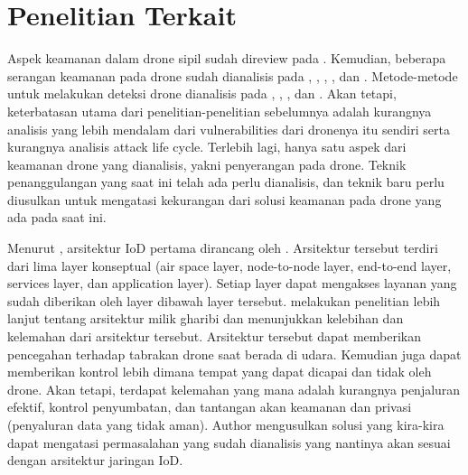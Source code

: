\section{Penelitian Terkait}
\label{sec:penelitianterkait}

Aspek keamanan dalam drone sipil sudah direview pada \citep{altawy2016security}. Kemudian, beberapa serangan keamanan pada drone sudah dianalisis pada \citep{he2017drone}, \citep{yampolskiy2013taxonomy}, \citep{sedjelmaci2018cyber}, \citep{humphreys2012statement}, dan \citep{shepard2012evaluation}. Metode-metode untuk melakukan deteksi drone dianalisis pada \citep{guvencc2017detection}, \citep{sturdivant2017systems}, \citep{shi2018anti}, dan \citep{nassi2019}. Akan tetapi, keterbatasan utama dari penelitian-penelitian sebelumnya adalah kurangnya analisis yang lebih mendalam dari vulnerabilities dari dronenya itu sendiri serta kurangnya analisis attack life cycle. Terlebih lagi, hanya satu aspek dari keamanan drone yang dianalisis, yakni penyerangan pada drone. Teknik penanggulangan yang saat ini telah ada perlu dianalisis, dan teknik baru perlu diusulkan untuk mengatasi kekurangan dari solusi keamanan pada drone yang ada pada saat ini. 

Menurut \citet{yao2019qos}, arsitektur IoD pertama dirancang oleh \citet{gharibi2016internet}. Arsitektur tersebut terdiri dari lima layer konseptual (air space layer, node-to-node layer, end-to-end layer, services layer, dan application layer). Setiap layer dapat mengakses layanan yang sudah diberikan oleh layer dibawah layer tersebut. \citet{lin2018security} melakukan penelitian lebih lanjut tentang arsitektur milik gharibi dan menunjukkan kelebihan dan kelemahan dari arsitektur tersebut. Arsitektur tersebut dapat memberikan pencegahan terhadap tabrakan drone saat berada di udara. Kemudian juga dapat memberikan kontrol lebih dimana tempat yang dapat dicapai dan tidak oleh drone. Akan tetapi, terdapat kelemahan yang mana adalah kurangnya penjaluran efektif, kontrol penyumbatan, dan tantangan akan keamanan dan privasi (penyaluran data yang tidak aman). Author mengusulkan solusi yang kira-kira dapat mengatasi permasalahan yang sudah dianalisis yang nantinya akan sesuai dengan arsitektur jaringan IoD. 

